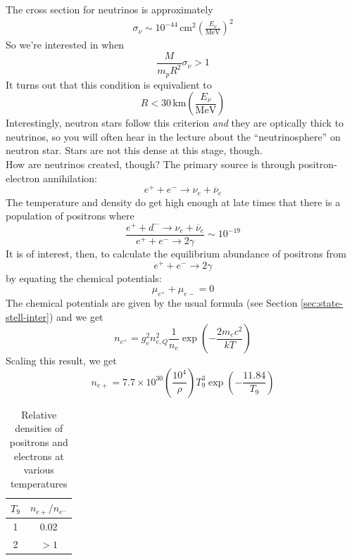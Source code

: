 \documentclass[10pt]{article}
\numberwithin{equation}{section}
\newcommand{\n}{\noindent}
\begin{document}
    \n The cross section for neutrinos is approximately
    \begin{align}
      \label{eq:338}
      \sigma_\nu\sim 10^{-44}\,\mathrm{cm^2}\left(\frac{E_\nu}{\mathrm
{MeV}}\right)^2
    \end{align}
    So we're interested in when
    \begin{equation}
      \label{eq:339}
      \frac{M}{m_pR^2}\sigma_\nu>1
    \end{equation}
    It turns out that this condition is equivalient to
    \begin{equation}
      \label{eq:341}
      R<30\,\mathrm{km}\left(\frac{E_\nu}{\mathrm{MeV}}\right)
    \end{equation}
    Interestingly, neutron stars follow this criterion \emph{and} they
    are optically thick to neutrinos, so you will often hear in the
    lecture about the ``neutrinosphere'' on neutron star. Stars are
    not this dense at this stage, though.\\

    \n How are neutrinos created, though? The primary source is through
    positron-electron annihilation:
    \begin{equation}
      \label{eq:342}
      e^++e^-\to\nu_e+\overline{\nu}_e
    \end{equation}
    The temperature and density do get high enough at late times that
    there is a population of positrons where
    \begin{equation}
      \label{eq:343}
      \frac{e^++d^-\to \nu_e+\overline{\nu}_e}{e^++e^-\to 2\gamma}\sim 10^
{-19}
    \end{equation}
    It is of interest, then, to calculate the equilibrium abundance of
    positrons from
    \begin{equation}
      \label{eq:344}
      e^++e^-\to 2\gamma
    \end{equation}
    by equating the chemical potentials:
    \begin{equation}
      \label{eq:345}
      \mu_{e^+}+\mu_{e-}=0
    \end{equation}
    The chemical potentials are given by the usual formula (see Section
    \ref{sec:state-stell-inter}) and we get
    \begin{equation}
      \label{eq:346}
      n_{e^+}=g_e^2n_{e,Q}^2\frac{1}{n_e}\exp\left(-\frac{2m_e c^2}{kT}
\right)
    \end{equation}
    Scaling this result, we get
    \begin{equation}
      \label{eq:347}
      n_{e+}=7.7\times 10^{30}\left(\frac{10^4}{\rho}\right)T_9^3\exp\left
(-\frac{11.84}{T_9}\right)
    \end{equation}
    \begin{table}[h]
      \centering
      \begin{tabular}{c c}
        $T_9$ & $n_{e+}/n_{e^-}$\\
        \hline \hline
        1 & 0.02\\
        2 & $>1$
      \end{tabular}
      \caption{Relative densities of positrons and electrons at various 
temperatures}
      \label{tab:positron}
    \end{table}
\end{document}
